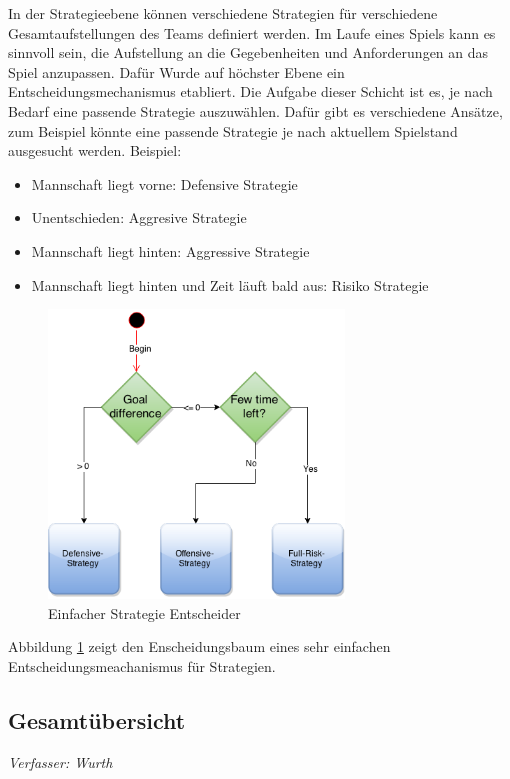\documentclass[fontsize=12pt,a4paper,final]{scrartcl}[2003/01/01]
\begin{document}
In der Strategieebene können verschiedene Strategien für verschiedene Gesamtaufstellungen des Teams definiert werden. Im Laufe eines Spiels kann es sinnvoll sein, die Aufstellung an die Gegebenheiten und Anforderungen an das Spiel anzupassen. Dafür Wurde auf höchster Ebene ein Entscheidungsmechanismus etabliert. Die Aufgabe dieser Schicht ist es, je nach Bedarf eine passende Strategie auszuwählen. Dafür gibt es verschiedene Ansätze, zum Beispiel könnte eine passende Strategie je nach aktuellem Spielstand ausgesucht werden. Beispiel: 
\begin{itemize}
\item Mannschaft liegt vorne: Defensive Strategie
\item Unentschieden: Aggresive Strategie
\item Mannschaft liegt hinten: Aggressive Strategie
\item Mannschaft liegt hinten und Zeit läuft bald aus: Risiko Strategie
\end{itemize}

\begin{figure}[H]
	\centering
	\includegraphics[width=0.7\textwidth]{Grafiken/KI/SimpleStrategyDecider}
	\caption{Einfacher Strategie Entscheider}
	\label{Einfacher Strategie Entscheider}
\end{figure}

Abbildung \ref{Einfacher Strategie Entscheider} zeigt den Enscheidungsbaum eines sehr einfachen Entscheidungsmeachanismus für Strategien.

\pagebreak

\subsection{Gesamtübersicht}\label{sse:KI-Gesamtübersicht}
\textit{Verfasser: Wurth}\\
\end{document}
